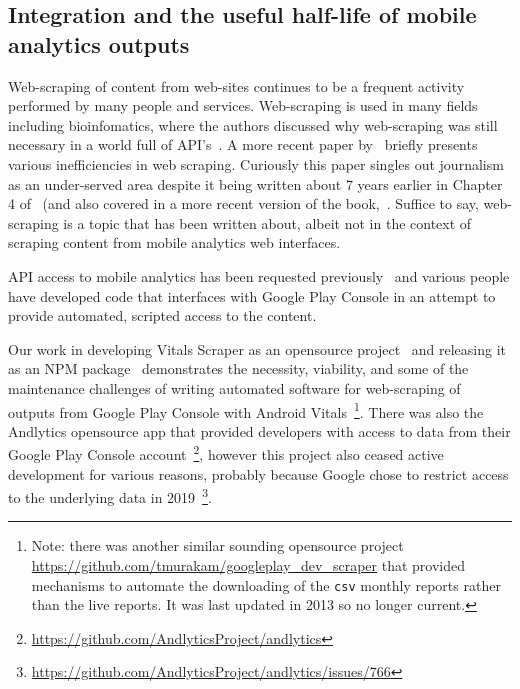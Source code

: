 \subsection{Integration and the useful half-life of mobile analytics outputs}
Web-scraping of content from web-sites continues to be a frequent activity performed by many people and services. Web-scraping is used in many fields including bioinfomatics, where the authors discussed why web-scraping was still necessary in a world full of API's~\citet{glez2014_web_scraping_in_an_API_world}. A more recent paper by~\citet{diouf2019_web_scraping_state_of_the_art_and_areas_of_application} briefly presents various inefficiencies in web scraping. Curiously this paper singles out journalism as an under-served area despite it being written about 7 years earlier in Chapter 4 of~\citet{gray2012_the_data_journalism_handbook} (and also covered in a more recent version of the book,~\citet[on pages 133, 238]{bounegru2021_the_data_journalism_handbook}. Suffice to say, web-scraping is a topic that has been written about, albeit not in the context of scraping content from mobile analytics web interfaces. 

API access to mobile analytics has been requested previously~\citep{stackoverflow2013_getting_statistics_from_google_play_developer_console_with_an_api} and various people have developed code that interfaces with Google Play Console in an attempt to provide automated, scripted access to the content.

Our work in developing Vitals Scraper as an opensource project~\citep{vitals_scraper_github_package} and releasing it as an NPM package~\citep{vitals_scraper_npm_package} demonstrates the necessity, viability, and some of the maintenance challenges of writing automated software for web-scraping of outputs from Google Play Console with Android Vitals~\footnote{Note: there was another similar sounding opensource project \url{https://github.com/tmurakam/googleplay_dev_scraper} that provided mechanisms to automate the downloading of the \texttt{csv} monthly reports rather than the live reports. It was last updated in 2013 so no longer current.}. There was also the Andlytics opensource app that provided developers with access to data from their Google Play Console account~\footnote{\url{https://github.com/AndlyticsProject/andlytics}}, however this project also ceased active development for various reasons, probably because Google chose to restrict access to the underlying data in 2019~\footnote{\url{https://github.com/AndlyticsProject/andlytics/issues/766}}. %


